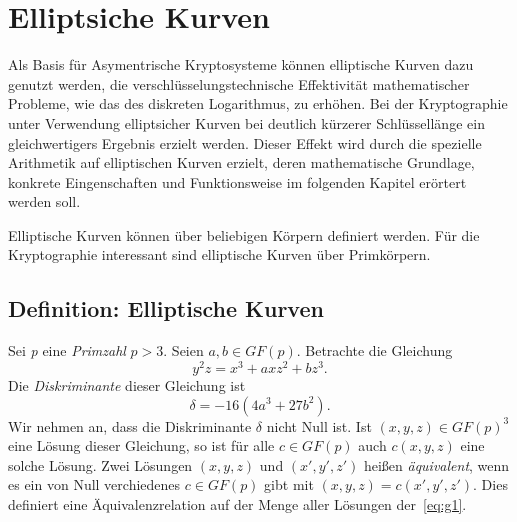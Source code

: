 

\chapter{Elliptsiche Kurven}
Als Basis für Asymentrische Kryptosysteme können elliptische Kurven dazu genutzt werden, die verschlüsselungstechnische Effektivität mathematischer Probleme, wie das des diskreten Logarithmus, zu erhöhen. Bei der Kryptographie unter Verwendung elliptsicher Kurven bei deutlich kürzerer Schlüssellänge ein gleichwertigers Ergebnis erzielt werden. Dieser Effekt wird durch die spezielle Arithmetik auf elliptischen Kurven erzielt, deren mathematische Grundlage, konkrete Eingenschaften und Funktionsweise im folgenden Kapitel erörtert werden soll.

Elliptische Kurven können über beliebigen Körpern definiert werden. Für die Kryptographie interessant sind elliptische Kurven über Primkörpern.

\section{Definition: Elliptische Kurven}
 Sei \textit{p} eine \textit{Primzahl} $p>3$. Seien $a,b \in GF(p)$. Betrachte die Gleichung
\begin{equation}
    y^2 z = x^3 + axz^2 + bz^3.\label{eq:g1}
\end{equation} Die \textit{Diskriminante}  dieser Gleichung ist
\begin{equation}
    \delta = -16(4a^3 + 27b^2).\label{eq:g2}
\end{equation}
Wir nehmen an, dass die Diskriminante $\delta$ nicht Null ist. Ist $(x,y,z) \in GF(p)^3$ eine Lösung dieser
Gleichung, so ist für alle $c \in GF(p)$ auch $c(x,y,z)$ eine solche Lösung. Zwei Lösungen $(x,y,z)$ und $(x',y',z')$
heißen \textit{äquivalent}, wenn es ein von Null verchiedenes $c \in GF(p)$ gibt mit $(x,y,z) = c(x',y',z')$. Dies
definiert eine Äquivalenzrelation auf der Menge aller Lösungen der~\eqref{eq:g1}.

